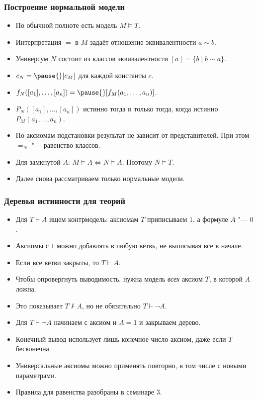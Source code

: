 \documentclass[10pt]{beamer}
\begin{document}
\begin{frame}
    \frametitle{Построение нормальной модели}
    \begin{itemize}
        \item По обычной полноте есть модель $M\vDash T$. \pause
        \item Интерпретация $=$ в $M$ задаёт \pause отношение эквивалентности $a\sim b$. \pause
        \item Универсум $N$ состоит из классов эквивалентности $[a]=\{b\mid b\sim a\}$. \pause
        \item $c_N=\pause{}[c_M]$ для каждой константы $c$. \pause
        \item $f_N([a_1],\ldots,[a_n])=\pause{}[f_M(a_1,\ldots,a_n)]$. \pause
        \item $P_N([a_1],\ldots,[a_n])$ истинно тогда и только тогда, когда \pause истинно $P_M(a_1,\ldots,a_n)$. \pause
        \item По аксиомам подстановки результат не зависит от представителей. При этом $=_N$ "--- равенство классов. \pause
        \item Для замкнутой $A$: $M\vDash A\Leftrightarrow N\vDash A$. Поэтому $N\vDash T$. \pause
        \item Далее снова рассматриваем только нормальные модели.
    \end{itemize}
\end{frame}

\begin{frame}
    \frametitle{Деревья истинности для теорий}
    \begin{itemize}
        \item Для $T\vdash A$ ищем контрмодель: аксиомам $T$ приписываем $1$, а формуле $A$ "--- $0$.
        \item Аксиомы с $1$ можно добавлять в любую ветвь, не выписывая все в начале.
        \item Если все ветви закрыты, то $T\vdash A$. \pause
        \item Чтобы опровергнуть выводимость, нужна модель \emph{всех} аксиом $T$, в которой $A$ ложна.
        \item Это показывает $T\nvdash A$, но не обязательно $T\vdash\neg A$. \pause
        \item Для $T\vdash\neg A$ начинаем с аксиом и $A=1$ и закрываем дерево.
        \item Конечный вывод использует лишь конечное число аксиом, даже если $T$ бесконечна.
        \item Универсальные аксиомы можно применять повторно, в том числе с новыми параметрами.
        \item Правила для равенства разобраны в семинаре 3.
    \end{itemize}
\end{frame}
\end{document}
